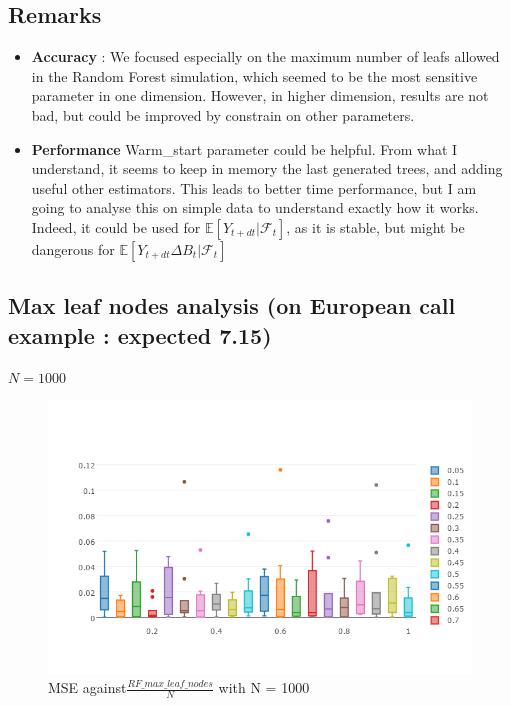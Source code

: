 \documentclass[10pt]{beamer}
\begin{document}
\subsection{Remarks}

\begin{frame}
	\begin{itemize}
		\item \textbf{Accuracy} : We focused especially on the maximum number of leafs allowed in the Random Forest simulation, which seemed to be the most sensitive parameter in one dimension. However, in higher dimension, results are not bad, but could be improved by constrain on other parameters. 
		\item \textbf{Performance} Warm\_start parameter could be helpful. From what I understand, it seems to keep in memory the last generated trees, and adding useful other estimators. This leads to better time performance, but I am going to analyse this on simple data to understand exactly how it works. 
		Indeed, it could be used for $\mathbb{E}[Y_{t+dt}|\mathcal{F}_t]$, as it is stable, but might be dangerous for $\mathbb{E}[Y_{t+dt}\Delta B_t|\mathcal{F}_t]$
	\end{itemize}
\end{frame}


\subsection{Max leaf nodes analysis (on European call example : expected 7.15)}

\begin{frame}{$N = 1000$}
	
	\centering
	\begin{figure}
		
	\includegraphics[scale=0.4]{max_leaf_1000.png}
	\caption{MSE against$\frac{RF\_max\_leaf\_nodes }{N}$  with N = 1000}
\end{figure}
\end{frame}
\end{document}
